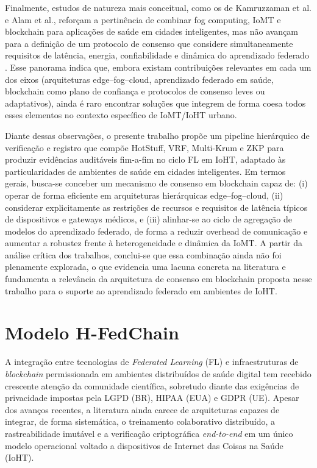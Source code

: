 \documentclass[12pt]{article}
\begin{document}
Finalmente, estudos de natureza mais conceitual, como os de Kamruzzaman et al. e Alam et al., reforçam a pertinência de combinar fog computing, IoMT e blockchain para aplicações de saúde em cidades inteligentes, mas não avançam para a definição de um protocolo de consenso que considere simultaneamente requisitos de latência, energia, confiabilidade e dinâmica do aprendizado federado \cite{kamruzzaman2022,alam2022}. Esse panorama indica que, embora existam contribuições relevantes em cada um dos eixos (arquiteturas edge–fog–cloud, aprendizado federado em saúde, blockchain como plano de confiança e protocolos de consenso leves ou adaptativos), ainda é raro encontrar soluções que integrem de forma coesa todos esses elementos no contexto específico de IoMT/IoHT urbano.

Diante dessas observações, o presente trabalho propõe um pipeline hierárquico de verificação e registro que compõe HotStuff, VRF, Multi-Krum e ZKP para produzir evidências auditáveis fim-a-fim no ciclo FL em IoHT, adaptado às particularidades de ambientes de saúde em cidades inteligentes. Em termos gerais, busca-se conceber um mecanismo de consenso em blockchain capaz de: (i) operar de forma eficiente em arquiteturas hierárquicas edge–fog–cloud, (ii) considerar explicitamente as restrições de recursos e requisitos de latência típicos de dispositivos e gateways médicos, e (iii) alinhar-se ao ciclo de agregação de modelos do aprendizado federado, de forma a reduzir overhead de comunicação e aumentar a robustez frente à heterogeneidade e dinâmica da IoMT. A partir da análise crítica dos trabalhos, conclui-se que essa combinação ainda não foi plenamente explorada, o que evidencia uma lacuna concreta na literatura e fundamenta a relevância da arquitetura de consenso em blockchain proposta nesse trabalho para o suporte ao aprendizado federado em ambientes de IoHT.

\section{Modelo H-FedChain}

A integração entre tecnologias de \textit{Federated Learning} (FL) e infraestruturas de \textit{blockchain} permissionada em ambientes distribuídos de saúde digital tem recebido crescente atenção da comunidade científica, sobretudo diante das exigências de privacidade impostas pela LGPD (BR), HIPAA (EUA) e GDPR (UE). Apesar dos avanços recentes, a literatura ainda carece de arquiteturas capazes de integrar, de forma sistemática, o treinamento colaborativo distribuído, a rastreabilidade imutável e a verificação criptográfica \textit{end-to-end} em um único modelo operacional voltado a dispositivos de Internet das Coisas na Saúde (IoHT).
\end{document}
